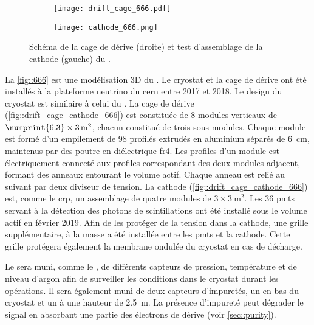       \begin{figure}[!htb]
        \begin{subfigure}{0.48\textwidth}
          \centering
          \texttt{[image: drift\_cage\_666.pdf]}
        \end{subfigure}\hfill
        \begin{subfigure}{0.48\textwidth}
          \centering
          \texttt{[image: cathode\_666.png]}
        \end{subfigure}
        \caption[Cathode et cage de dérive du \SSS{}]{\label{fig::drift_cage_cathode_666}Schéma de la cage de dérive (droite) et test d'assemblage de la cathode (gauche) du \SSS{}.}
      \end{figure}

      La \autoref{fig::666} est une modélisation 3D du \SSS{}. Le cryostat et la cage de dérive ont été installés à la plateforme neutrino du \gls{cern} entre 2017 et 2018. Le design du cryostat est similaire à celui du \TOO{}. La cage de dérive (\autoref{fig::drift_cage_cathode_666}) est constituée de 8 modules verticaux de $\numprint{6.3}\times\SI{3}{\meter\squared}$, chacun constitué de trois sous-modules. Chaque module est formé d'un empilement de 98 profilés extrudés en aluminium séparés de \SI{6}{\centi\meter}, maintenus par des poutre en diélectrique \gls{fr4}. Les profiles d'un module est électriquement connecté aux profiles correspondant des deux modules adjacent, formant des anneaux entourant le volume actif. Chaque anneau est relié au suivant par deux diviseur de tension. La cathode (\autoref{fig::drift_cage_cathode_666}) est, comme le \gls{crp}, un assemblage de quatre modules de $3\times\SI{3}{\meter\squared}$. Les 36 \glspl{pmt} servant à la détection des photons de scintillations ont été installé sous le volume actif en février 2019. Afin de les protéger de la tension dans la cathode, une grille supplémentaire, à la masse a été installée entre les \glspl{pmt} et la cathode. Cette grille protégera également la membrane ondulée du cryostat en cas de décharge. 

      Le \SSS{} sera muni, comme le \TOO{}, de différents capteurs de pression, température et de niveau d'argon afin de surveiller les conditions dans le cryostat durant les opérations. Il sera également muni de deux capteurs d'impuretés, un en bas du cryostat et un à une hauteur de \SI{2.5}{\meter}. La présence d'impureté peut dégrader le signal en absorbant une partie des électrons de dérive (voir \autoref{sec::purity}).

